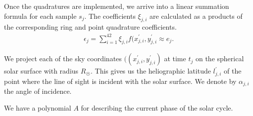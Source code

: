 \documentclass{aa}
\newcommand{\eqnl}[2]{\begin{eqnarray}\label{#1}#2\end{eqnarray}}
\begin{document}
  Once the quadratures are implemented, we arrive into a linear summation formula for each sample $s_j$. The coefficients $\xi_{j,i}$ are calculated as a products of the corresponding ring and point quadrature coefficients.
  \eqnl{inversion_beam3}{
  \epsilon_j = \sum \limits_{i=1}^{42} \xi_{j,i} f(x^{\prime}_{j,i}, y^{\prime}_{j,i} \approx e_j \text{.}
  }

   We project each of the sky coordinates $((x^{\prime}_{j,i}, y^{\prime}_{j,i})$ at time $t_j$ on the spherical solar 
   surface with radius $R_{\astrosun}$. This gives us the heliographic latitude $l^{\prime}_{j,i}$ of the point where the line of sight is incident with the solar surface. We denote by $\alpha_{j,i}$ the angle of incidence.
   
  We have a polynomial $A$ for describing the current phase of the solar 
   cycle.
   


\begin{acknowledgements}
\end{acknowledgements}


%
%



\end{document}
